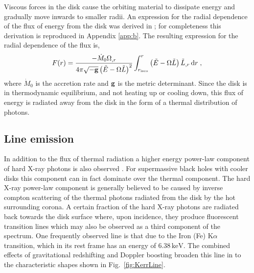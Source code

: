 Viscous forces in the disk cause the orbiting material to dissipate energy and gradually move inwards to smaller radii. An expression for the radial dependence of the flux of energy from the disk was derived in \cite{1974ApJ...191..499P}; for completeness this derivation is reproduced in Appendix \ref{app:b}. The resulting expression for the radial dependence of the flux is,
\begin{equation}\label{eq:radialfluxmain} F(r)=\frac{-\dot{M}_{0}\Omega_{,r}}{4\pi \sqrt{-{\bf{g}}}\left( \tilde{E}-\Omega \tilde{L} \right)^{2}} \int_{r_{\textrm{isco}}}^{r}\left(\tilde{E}-\Omega \tilde{L}\right) \tilde{L}_{,r}\, \textrm{d}r \; ,\end{equation}
where $\dot{M}_{0}$ is the accretion rate and ${\bf{g}}$ is the metric determinant. Since the disk is in thermodynamic equilibrium, and not heating up or cooling down, this flux of energy is radiated away from the disk in the form of a thermal distribution of photons.

\subsection{Line emission}\label{subsec:line}
In addition to the flux of thermal radiation a higher energy power-law component of hard X-ray photons is also observed \citep{1994MNRAS.269L..55Z}. For supermassive black holes with cooler disks this component can in fact dominate over the thermal component. The hard X-ray power-law component is generally believed to be caused by inverse compton scattering of the thermal photons radiated from the disk by the hot surrounding corona. A certain fraction of the hard X-ray photons are radiated back towards the disk surface where, upon incidence, they produce fluorescent transition lines which may also be observed as a third component of the spectrum. One frequently observed line is that due to the Iron (Fe) K$\alpha$ transition, which in its rest frame has an energy of $6.38\,\textrm{keV}$. The combined effects of gravitational redshifting and Doppler boosting broaden this line in to the characteristic shapes shown in Fig.\ \ref{fig:KerrLine}.

